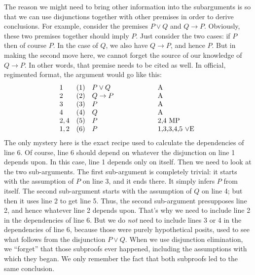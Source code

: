 The reason we might need to bring other information into the
subarguments is so that we can use disjunctions together with other
premises in order to derive conclusions.  For example, consider the
premises $P\vee Q$ and $Q\to P$.  Obviously, these two premises
together should imply $P$.  Just consider the two cases: if $P$ then
of course $P$.  In the case of $Q$, we also have $Q\to P$, and hence
$P$.  But in making the second move here, we cannot forget the source
of our knowledge of $Q\to P$.  In other words, that premise needs to
be cited as well.  In official, regimented format, the argument would
go like this:
\[ \begin{array}{l l >{$}p{3cm}<{$} p{2cm}}
    1 & (1) & P\vee Q & A \\
    2 & (2) & Q\to P  & A \\
    3 & (3) & P       & A \\
    4 & (4) & Q       & A \\
    2,4 & (5) & P     & 2,4 MP \\
    1,2 & (6) & P & 1,3,3,4,5
    $\vee$E \end{array} \] The only mystery here is the exact recipe
used to calculate the dependencies of line 6.  Of course, line 6
should depend on whatever the disjunction on line 1 depends upon.  In
this case, line 1 depends only on itself.  Then we need to look at the
two sub-arguments.  The first sub-argument is completely trivial: it
starts with the assumption of $P$ on line 3, and it ends there.  It
simply infers $P$ from itself.  The second sub-argument starts with
the assumption of $Q$ on line 4; but then it uses line 2 to get line
5.  Thus, the second sub-argument presupposes line 2, and hence
whatever line 2 depends upon.  That's why we need to include line 2 in
the dependencies of line 6.  But we do {\it not} need to include lines
3 or 4 in the dependencies of line 6, because those were purely
hypothetical posits, used to see what follows from the disjunction
$P\vee Q$.  When we use disjunction elimination, we ``forget'' that
those subproofs ever happened, including the assumptions with which
they began.  We only remember the fact that both subproofs led to the
same conclusion.


